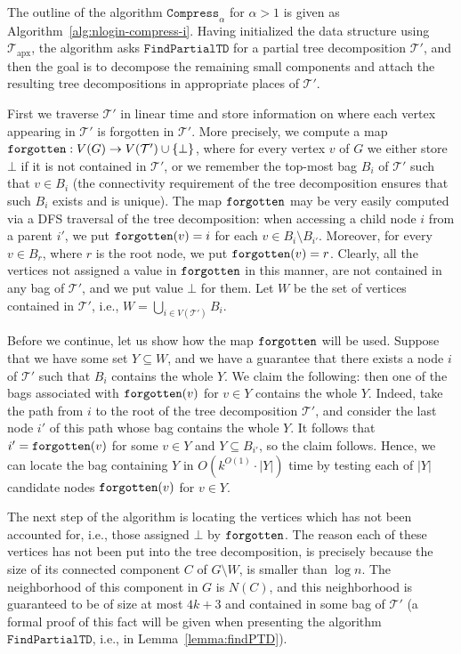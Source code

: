 \documentclass[a4paper,11pt]{article}
\theoremstyle{definition}
\theoremstyle{remark}
\newcommand{\depth}{\alpha}
\newcommand{\findPTD}{\mathtt{FindPartialTD}}
\newcommand{\compress}[1]{\mathtt{Compress}_{#1}}
\newcommand{\td}{\mathcal{T}} \newcommand{\tw}{\mathrm{tw}} \newcommand{\w}{\mathrm{w}}
\newcommand{\apx}{\textrm{apx}}
\begin{document}
The outline of the algorithm $\compress{\depth}$ for $\depth > 1$ is
given as Algorithm~\ref{alg:nlogin-compress-i}.  Having initialized
the data structure using $\td_\apx$, the algorithm asks $\findPTD$ for
a partial tree decomposition $\td'$, and then the goal is to decompose
the remaining small components and attach the resulting tree
decompositions in appropriate places of $\td'$.

First we traverse $\td'$ in linear time and store information on where
each vertex appearing in $\td'$ is forgotten in $\td'$.  More
precisely, we compute a map $\forg: V(G) \to V(\td')\cup \{\bot\}$,
where for every vertex $v$ of $G$ we either store $\bot$ if it is not
contained in $\td'$, or we remember the top-most bag $B_i$ of $\td'$
such that $v\in B_i$ (the connectivity requirement of the tree
decomposition ensures that such $B_i$ exists and is unique).  The map
$\texttt{forgotten}$ may be very easily computed via a DFS traversal of the tree
decomposition: when accessing a child node $i$ from a parent $i'$, we
put $\texttt{forgotten}(v)=i$ for each $v\in B_i\setminus B_{i'}$.  Moreover, for
every $v\in B_r$, where $r$ is the root node, we put $\texttt{forgotten}(v)=r$.
Clearly, all the vertices not assigned a value in $\texttt{forgotten}$ in this
manner, are not contained in any bag of $\td'$, and we put value
$\bot$ for them.  Let $W$ be the set of vertices contained in $\td'$,
i.e., $W=\bigcup_{i\in V(\td')} B_i$.

Before we continue, let us show how the map $\texttt{forgotten}$ will be used.
Suppose that we have some set $Y\subseteq W$, and we have a guarantee
that there exists a node $i$ of $\td'$ such that $B_i$ contains the
whole $Y$.  We claim the following: then one of the bags associated
with $\texttt{forgotten}(v)$ for $v\in Y$ contains the whole $Y$.  Indeed, take the
path from $i$ to the root of the tree decomposition $\td'$, and
consider the last node $i'$ of this path whose bag contains the whole
$Y$.  It follows that $i'=\texttt{forgotten}(v)$ for some $v\in Y$ and $Y\subseteq
B_{i'}$, so the claim follows.  Hence, we can locate the bag
containing $Y$ in $O(k^{O(1)}\cdot |Y|)$ time by testing each of $|Y|$
candidate nodes $\texttt{forgotten}(v)$ for $v\in Y$.

The next step of the algorithm is locating the vertices which has not
been accounted for, i.e., those assigned $\bot$ by $\texttt{forgotten}$.  The
reason each of these vertices has not been put into the tree
decomposition, is precisely because the size of its connected
component $C$ of $G\setminus W$, is smaller than $\log n$.  The
neighborhood of this component in $G$ is $N(C)$, and this neighborhood
is guaranteed to be of size at most $4k+3$ and contained in some bag
of $\td'$ (a formal proof of this fact will be given when presenting
the algorithm $\findPTD$, i.e., in Lemma~\ref{lemma:findPTD}).
\end{document}
